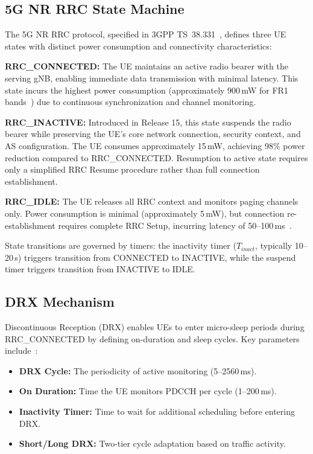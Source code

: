\documentclass[conference]{IEEEtran}
\begin{document}
\subsection{5G NR RRC State Machine}
\label{subsec:rrc_state}

The 5G NR RRC protocol, specified in 3GPP TS~38.331~\cite{3GPPTS38331}, defines three UE states with distinct power consumption and connectivity characteristics:

\textbf{RRC\_CONNECTED:} The UE maintains an active radio bearer with the serving gNB, enabling immediate data transmission with minimal latency. This state incurs the highest power consumption (approximately 900\,mW for FR1 bands~\cite{3GPPTR38840}) due to continuous synchronization and channel monitoring.

\textbf{RRC\_INACTIVE:} Introduced in Release 15, this state suspends the radio bearer while preserving the UE's core network connection, security context, and AS configuration. The UE consumes approximately 15\,mW, achieving 98\% power reduction compared to RRC\_CONNECTED. Resumption to active state requires only a simplified RRC Resume procedure rather than full connection establishment.

\textbf{RRC\_IDLE:} The UE releases all RRC context and monitors paging channels only. Power consumption is minimal (approximately 5\,mW), but connection re-establishment requires complete RRC Setup, incurring latency of 50--100\,ms~\cite{Khlass2019}.

State transitions are governed by timers: the inactivity timer ($T_{inact}$, typically 10--20\,s) triggers transition from CONNECTED to INACTIVE, while the suspend timer triggers transition from INACTIVE to IDLE.

\subsection{DRX Mechanism}
\label{subsec:drx}

Discontinuous Reception (DRX) enables UEs to enter micro-sleep periods during RRC\_CONNECTED by defining on-duration and sleep cycles. Key parameters include~\cite{LinSurvey2023}:

\begin{itemize}
    \item \textbf{DRX Cycle:} The periodicity of active monitoring (5--2560\,ms).
    \item \textbf{On Duration:} Time the UE monitors PDCCH per cycle (1--200\,ms).
    \item \textbf{Inactivity Timer:} Time to wait for additional scheduling before entering DRX.
    \item \textbf{Short/Long DRX:} Two-tier cycle adaptation based on traffic activity.
\end{itemize}
\end{document}
